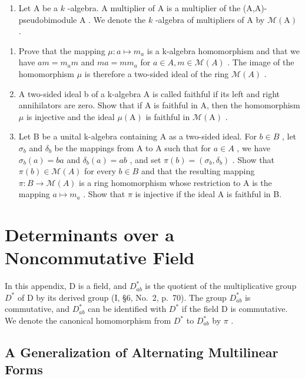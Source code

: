 \begin{enumerate}
\def\labelenumi{\arabic{enumi})}
\setcounter{enumi}{14}
\tightlist
\item
  Let \(\mathrm{A}\) be a \(k\) -algebra. A multiplier of \(\mathrm{A}\) is a multiplier of the (A,A)-pseudobimodule \(\mathrm{A}\) . We denote the \(k\) -algebra of multipliers of \(\mathrm{A}\) by \(\mathcal{M}(\mathrm{A})\) .
\end{enumerate}

\begin{enumerate}
\def\labelenumi{\alph{enumi})}
\item
  Prove that the mapping \(\mu: a \mapsto m_{a}\) is a k-algebra homomorphism and that we have \(am = m_{a}m\) and \(ma = mm_{a}\) for \(a \in A, m \in \mathcal{M}(A)\) . The image of the homomorphism \(\mu\) is therefore a two-sided ideal of the ring \(\mathcal{M}(A)\) .
\item
  A two-sided ideal b of a k-algebra A is called faithful if its left and right annihilators are zero. Show that if A is faithful in A, then the homomorphism \(\mu\) is injective and the ideal \(\mu(\mathrm{A})\) is faithful in \(\mathcal{M}(\mathrm{A})\) .
\item
  Let B be a unital k-algebra containing A as a two-sided ideal. For \(b \in B\) , let \(\sigma_{b}\) and \(\delta_{b}\) be the mappings from A to A such that for \(a \in A\) , we have \(\sigma_{b}(a) = ba\) and \(\delta_{b}(a) = ab\) , and set \(\pi(b) = (\sigma_{b}, \delta_{b})\) . Show that \(\pi(b) \in \mathcal{M}(A)\) for every \(b \in B\) and that the resulting mapping \(\pi : B \to \mathcal{M}(A)\) is a ring homomorphism whose restriction to A is the mapping \(a \mapsto m_{a}\) . Show that \(\pi\) is injective if the ideal A is faithful in B.
\end{enumerate}

\chapter{Determinants over a Noncommutative Field}

In this appendix, D is a field, and \(D_{ab}^{*}\) is the quotient of the multiplicative group \(D^{*}\) of D by its derived group (I, §6, No.~2, p.~70). The group \(D_{ab}^{*}\) is commutative, and \(D_{ab}^{*}\) can be identified with \(D^{*}\) if the field D is commutative. We denote the canonical homomorphism from \(D^{*}\) to \(D_{ab}^{*}\) by \(\pi\) .

\section{A Generalization of Alternating Multilinear Forms}


